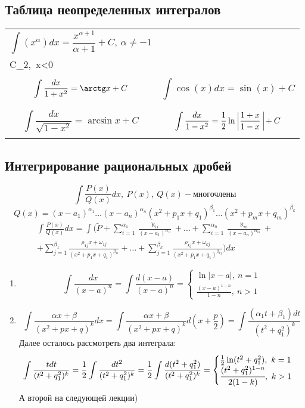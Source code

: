 \subsection{Таблица неопределенных интегралов}
    \begin{tabular}{p{8cm}|p{}}
        \toprule
        \[\int(x^\alpha)dx = \frac{x^{\alpha + 1}}{\alpha + 1} + C, \ \alpha \neq -1\] & \[\int\frac{dx}{x} = ln|x| + \begin{cases}C_1,\ x>0\\C_2,\ x<0\end{cases}\] \\
        \midrule
        \[\int\frac{dx}{1 + x^2} = \arctg x + C\] & \[\int \cos(x)dx = \sin(x) + C\] \\
        \midrule
        \[\int\frac{dx}{\sqrt{1 - x^2}} = \arcsin x + C\] & \[\int\frac{dx}{1 - x^2} = \frac{1}{2}\ln\ \vline\frac{1+x}{1-x}\ \vline + C\] \\
        \bottomrule
    \end{tabular}
\subsection{Интегрирование рациональных дробей}
\[\int\frac{P(x)}{Q(x)}dx,\ P(x),\ Q(x) - \text{многочлены}\]
\[Q(x) = (x-a_1)^{\alpha_1}\dots(x-a_n)^{\alpha_n}(x^2+p_1x+q_1)^{\beta_1}\dots(x^2+p_mx+q_m)^{\beta_k}\]
\begin{multline*}
    \int\frac{P(x)}{Q(x)}dx = \int(\tilde{P} + \sum \limits_{i=1}^{\alpha_1}\frac{\aleph_{1i}}{(x-a_1)^{\alpha_{1i}}} +\dots+ \sum \limits_{i=1}^{\alpha_n}\frac{\aleph_{ni}}{(x-a_n)^{\alpha_{ni}}} + \\
    + \sum \limits_{j=1}^{\beta_1}\frac{\rho_{1j}x + \omega_{1j}}{(x^2+p_1x+q_1)^{\beta_{1i}}} + \dots + \sum \limits_{j=1}^{\beta_k}\frac{\rho_{kj}x + \omega_{kj}}{(x^2+p_1x+q_1)^{\beta_{kj}}}) dx
\end{multline*}
\begin{enumerate}
    \item \[\int\frac{dx}{(x-a)^n} = \int\frac{d(x-a)}{(x-a)^n} = \begin{cases}\ln|x-a|,\ n = 1\\ \frac{(x-a)^{1-n}}{1-n}, \ n > 1\end{cases}\]
    \item \[\int\frac{\alpha x+\beta}{(x^2+px+q)^k}dx = \int\frac{\alpha x+\beta}{(x^2+px+q)^k}d(x+\frac{p}{2}) = \int\frac{(\alpha_1 t+\beta_1)dt}{(t^2+q_1^2)^k}\]
    Далее осталось рассмотреть два интеграла:
    \[\int\frac{tdt}{(t^2+q_1^2)^k} = \frac{1}{2}\int\frac{dt^2}{(t^2+q_1^2)^k} = \frac{1}{2}\int\frac{d(t^2+q_1^2)}{(t^2+q_1^2)^k} = \begin{cases}\frac{1}{2}\ln(t^2+q_1^2),\ k = 1\\ \cfrac{(t^2+q_1^2)^{1-n}}{2(1-k)}, \ k > 1\end{cases}\]
    А второй на следующей лекции)
\end{enumerate}